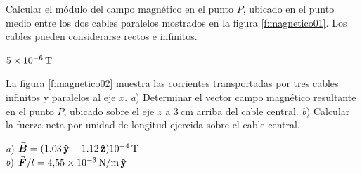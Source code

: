 \setcounter{figure}{0}

\begin{Exercise}\label{p:magnetico01}
    Calcular el módulo del campo magnético en el punto $P$, ubicado en el punto medio entre los dos cables paralelos mostrados en la figura \ref{f:magnetico01}. Los cables pueden considerarse rectos e infinitos.
\end{Exercise}
\begin{Answer}
    $\SI{5E-6}{\tesla}$
\end{Answer}
%
\begin{center}
\end{center}
%
\begin{Exercise}\label{p:magnetico02}
    La figura \ref{f:magnetico02} muestra las corrientes transportadas por tres cables infinitos y paralelos al eje $x$. \textit{a}) Determinar el vector campo magnético resultante en el punto $P$, ubicado sobre el eje $z$ a $\SI{3}{\centi\metre}$ arriba del cable central. \textit{b}) Calcular la fuerza neta por unidad de longitud ejercida sobre el cable central.
\end{Exercise}
\begin{Answer}
    \begin{minipage}[t]{.4\textwidth}
        \textit{a}) $\va*{B} = (1.03\,\vu{y}-1.12\,\vu{z})\SI{E-4}{\tesla}$\\ \textit{b}) $\va*{F}/l = \SI{4.55E-3}{\newton/\metre}\,\vu{y}$
    \end{minipage}
\end{Answer}
%
